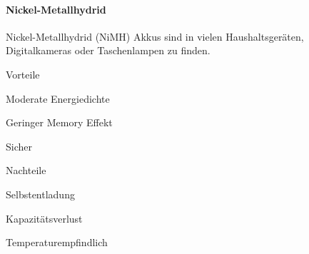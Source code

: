 \paragraph{Nickel-Metallhydrid}

Nickel-Metallhydrid (NiMH) Akkus sind in vielen Haushaltsgeräten, Digitalkameras oder Taschenlampen zu finden. 

\begin{minipage}[t]{0.48\textwidth}
\begin{items}
  \item [Vorteile]
  \item Moderate Energiedichte
  \item Geringer Memory Effekt
  \item Sicher
\end{items}
\end{minipage}
\hfill
\begin{minipage}[t]{0.48\textwidth}
\begin{items}
  \item [Nachteile]
  \item Selbstentladung
  \item Kapazitätsverlust
  \item Temperaturempfindlich
\end{items}
\end{minipage}

